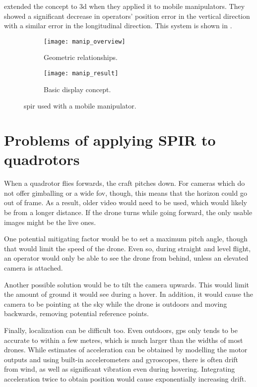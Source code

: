     \textcite{murata2014} extended the concept to \gls{3d} when they applied it to mobile manipulators.
    They showed a significant decrease in operators' position error in the vertical direction with a similar error in the longitudinal direction.
    This system is shown in .

    \begin{figure}[h]
      \centering
      \begin{subfigure}[b]{0.45\textwidth}
	\texttt{[image: manip\_overview]}
	\caption{Geometric relationships.}
	\label{fig:manip_overview_background}
      \end{subfigure}
      \hfill
      \begin{subfigure}[b]{0.45\textwidth}
	\texttt{[image: manip\_result]}
	\caption{Basic display concept.}
      \end{subfigure}
      \caption[SPIR with mobile manipulator]{\gls{spir} used with a mobile manipulator.\cite{murata2014}}
      \label{fig:manip_results}
    \end{figure}

\section{Problems of applying SPIR to quadrotors}
  When a quadrotor flies forwards, the craft pitches down.
  For cameras which do not offer gimballing or a wide \gls{fov}, though, this means that the horizon could go out of frame.
  As a result, older video would need to be used, which would likely be from a longer distance.
  If the drone turns while going forward, the only usable images might be the live ones.

  One potential mitigating factor would be to set a maximum pitch angle, though that would limit the speed of the drone.
  Even so, during straight and level flight, an operator would only be able to see the drone from behind, unless an elevated camera is attached.

  Another possible solution would be to tilt the camera upwards.
  This would limit the amount of ground it would see during a hover.
  In addition, it would cause the camera to be pointing at the sky while the drone is outdoors and moving backwards, removing potential reference points.

  Finally, localization can be difficult too.
  Even outdoors, \gls{gps} only tends to be accurate to within a few metres, which is much larger than the widths of most drones.
  While estimates of acceleration can be obtained by modelling the motor outputs and using built-in accelerometers and gyroscopes, there is often drift from wind, as well as significant vibration even during hovering.
  Integrating acceleration twice to obtain position would cause exponentially increasing drift.

